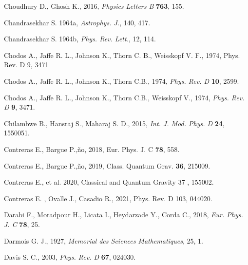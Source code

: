 \documentclass[]{aastex631}
\begin{document}
\begin{thebibliography}{99}
 Choudhury D.,  Ghosh K.,  2016, {\em  Physics Letters B} {\bf 763}, 155.

 Chandrasekhar S. 1964a, {\em Astrophys. J.}{, 140}, 417.

   Chandrasekhar S. 1964b, {\em Phys. Rev. Lett.}{, 12}, 114.

 Chodos A., Jaffe R. L., Johnson K., Thorn C. B., Weisskopf V. F., 1974, Phys. Rev. D 9, 3471 

   Chodos A.,  Jaffe R. L.,  Johnson K.,  Thorn C.B.,  1974, {\em  Phys. Rev. D} {\bf 10}, 2599.

    Chodos A.,  Jaffe R. L.,  Johnson K.,  Thorn C.B., Weisskopf V.,  1974, {\em  Phys. Rev. D} {\bf 9}, 3471. 

  Chilambwe B.,  Hansraj S.,  Maharaj S. D.,  2015, {\em Int. J. Mod. Phys. D} {\bf 24}, 1550051.

  Contreras E., Bargue P.,\~no,  2018, Eur. Phys. J. C \textbf{78}, 558.

 Contreras E., Bargue P.,\~no,  2019, Class. Quantum Grav. \textbf{36}, 215009.


 Contreras E., et al. 2020, Classical and Quantum Gravity 37 , 155002.

 Contreras E. , Ovalle J., Casadio R., 2021, Phys. Rev. D 103, 044020.

  Darabi F.,  Moradpour H.,  Licata I.,  Heydarzade Y., Corda C.,  2018, {\em  Eur. Phys. J. C} {\bf  78},  25. 

  Darmois G. J., 1927, {\em Memorial des Sciences Mathematiques}, 25, 1.

 Davis S. C.,  2003, {\em Phys. Rev. D} {\bf 67}, 024030.


\end{thebibliography}
\end{document}
